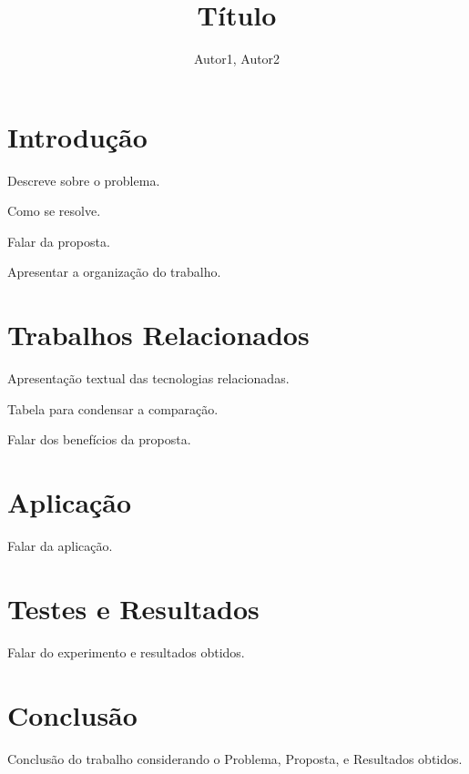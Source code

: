\documentclass[12pt]{article}
\title{Título}
\author{Autor1\inst{1}, Autor2\inst{1}}
\begin{document}
 

\maketitle

\begin{abstract}
    
\end{abstract}
 
\begin{resumo}
    
\end{resumo}

\section{Introdução}

    Descreve sobre o problema.
    
    Como se resolve.
    
    Falar da proposta.
    
    Apresentar a organização do trabalho.

\section{Trabalhos Relacionados}

    Apresentação textual das tecnologias relacionadas.
    
    Tabela para condensar a comparação.
    
    Falar dos benefícios da proposta.

\section{Aplicação}

    Falar da aplicação.

\section{Testes e Resultados}

    Falar do experimento e resultados obtidos.

\section{Conclusão}

    Conclusão do trabalho considerando o Problema, Proposta, e Resultados obtidos.



\end{document}

